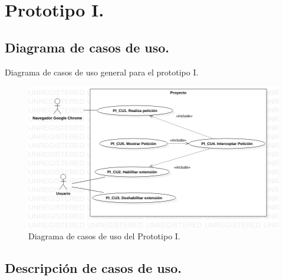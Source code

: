 \documentclass[12pt, a4paper, titlepage]{report}
\begin{document}
		\section{Prototipo I.}
			\subsection{Diagrama de casos de uso.}

				Diagrama de casos de uso general para el prototipo I.
				\begin{figure}[htb]
					\begin{center}
			    	\includegraphics[width=15cm]{./imagenes/Desarrollo/Prototipo_1/UCD_P1.png}
						\caption{Diagrama de casos de uso del Prototipo I.}
					\end{center}
				\end{figure}\newpage	
					
			\subsection{Descripción de casos de uso.}
			
				
\end{document}
